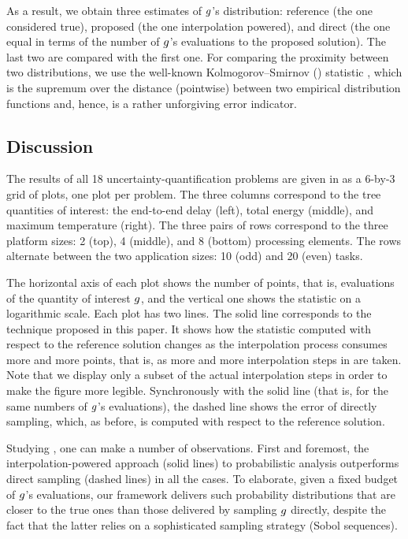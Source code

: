 As a result, we obtain three estimates of $g$'s distribution: reference (the
one considered true), proposed (the one interpolation powered), and direct (the
one equal in terms of the number of $g$'s evaluations to the proposed
solution). The last two are compared with the first one. For comparing the
proximity between two distributions, we use the well-known Kolmogorov--Smirnov
() statistic \cite{rao2009}, which is the supremum over the distance
(pointwise) between two empirical distribution functions and, hence, is a rather
unforgiving error indicator.


\subsection{Discussion}
The results of all 18 uncertainty-quantification problems are given in
 as a 6-by-3 grid of plots, one plot per problem. The three
columns correspond to the tree quantities of interest: the end-to-end delay
(left), total energy (middle), and maximum temperature (right). The three pairs
of rows correspond to the three platform sizes: 2 (top), 4 (middle), and 8
(bottom) processing elements. The rows alternate between the two application
sizes: 10 (odd) and 20 (even) tasks.

The horizontal axis of each plot shows the number of points, that is,
evaluations of the quantity of interest $g$, and the vertical one shows the
 statistic on a logarithmic scale. Each plot has two lines. The solid
line corresponds to the technique proposed in this paper. It shows how the
 statistic computed with respect to the reference solution changes as the
interpolation process consumes more and more points, that is, as more and more
interpolation steps in  are taken. Note that we display only
a subset of the actual interpolation steps in order to make the figure more
legible. Synchronously with the solid line (that is, for the same numbers of
$g$'s evaluations), the dashed line shows the error of directly sampling,
which, as before, is computed with respect to the reference solution.

Studying , one can make a number of observations. First and
foremost, the interpolation-powered approach (solid lines) to probabilistic
analysis outperforms direct sampling (dashed lines) in all the cases. To
elaborate, given a fixed budget of $g$'s evaluations, our framework delivers
such probability distributions that are closer to the true ones than those
delivered by sampling $g$ directly, despite the fact that the latter relies on
a sophisticated sampling strategy (Sobol sequences).

